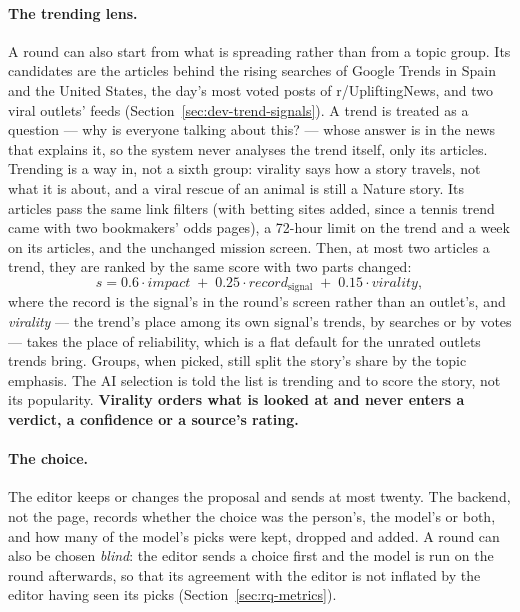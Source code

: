\paragraph{The trending lens.} A round can also start from what is
spreading rather than from a topic group. Its candidates are the
articles behind the rising searches of Google Trends in Spain and the
United States, the day's most voted posts of r/UpliftingNews, and two
viral outlets' feeds (Section~\ref{sec:dev-trend-signals}). A trend is
treated as a question --- why is everyone talking about this? --- whose
answer is in the news that explains it, so the system never analyses
the trend itself, only its articles. Trending is a way in, not a sixth
group: virality says how a story travels, not what it is about, and a
viral rescue of an animal is still a Nature story. Its articles pass
the same link filters (with betting sites added, since a tennis trend
came with two bookmakers' odds pages), a 72-hour limit on the trend and
a week on its articles, and the unchanged mission screen. Then, at most
two articles a trend, they are ranked by the same score with two parts
changed:
\[
  s = 0.6\cdot\textit{impact} \;+\; 0.25\cdot\textit{record}_{\text{signal}}
      \;+\; 0.15\cdot\textit{virality},
\]
where the record is the signal's in the round's screen rather than an
outlet's, and \textit{virality} --- the trend's place among its own
signal's trends, by searches or by votes --- takes the place of
reliability, which is a flat default for the unrated outlets trends
bring. Groups, when picked, still split the story's share by the topic
emphasis. The AI selection is told the list is trending and to score
the story, not its popularity. \textbf{Virality orders what is looked
at and never enters a verdict, a confidence or a source's rating.}

\paragraph{The choice.} The editor keeps or changes the proposal and
sends at most twenty. The backend, not the page, records whether the
choice was the person's, the model's or both, and how many of the
model's picks were kept, dropped and added. A round can also be chosen
\emph{blind}: the editor sends a choice first and the model is run on
the round afterwards, so that its agreement with the editor is not
inflated by the editor having seen its picks (Section~\ref{sec:rq-metrics}).
